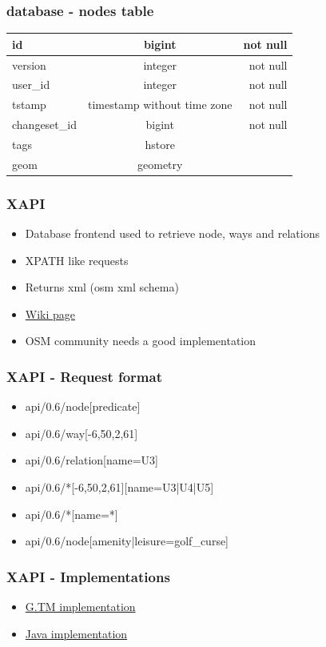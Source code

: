 \documentclass{beamer}
\begin{document}
\begin{frame}[fragile]
    \frametitle{database - nodes table}
    \begin{tabular}{| l | c | r |}
        \hline
        id & bigint & not null \\ \hline
        version & integer & not null \\ \hline
        user\_id & integer & not null \\ \hline
        tstamp & timestamp without time zone & not null \\ \hline
        changeset\_id & bigint & not null \\ \hline
        tags & hstore & \\ \hline
        geom & geometry & \\ \hline
    \end{tabular}
\end{frame}

\begin{frame}[fragile]
    \frametitle{XAPI}
    \begin{itemize}
        \item Database frontend used to retrieve node, ways and relations
        \item XPATH like requests
        \item Returns xml (osm xml schema)
        \item \href{http://wiki.openstreetmap.org/wiki/Xapi}{Wiki page}
        \item OSM community needs a good implementation
    \end{itemize}
\end{frame}
\begin{frame}[fragile]
    \frametitle{XAPI - Request format}
    \begin{itemize}
        \item api/0.6/node[predicate]
        \item api/0.6/way[-6,50,2,61]
        \item api/0.6/relation[name=U3]
        \item api/0.6/*[-6,50,2,61][name=U3|U4|U5]
        \item api/0.6/*[name=*]
        \item api/0.6/node[amenity|leisure=golf\_curse]
        \end{itemize}
\end{frame}
\begin{frame}[fragile]
    \frametitle{XAPI - Implementations}
    \begin{itemize}
        \item \href{http://xapi.openstreetmap.org/scripts/}{G.TM implementation}
        \item \href{https://github.com/iandees/xapi-servlet}{Java implementation}
    \end{itemize}
\end{frame}
\end{document}
